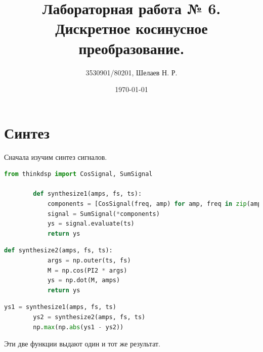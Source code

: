 \documentclass[a4paper, 12pt]{report}
\author{3530901/80201, Шелаев Н. Р.}
\title{Лабораторная работа № 6. Дискретное косинусное преобразование.}
\date{\today}
\begin{document}
	\maketitle
	\tableofcontents
	\listoffigures
	\lstlistoflistings

	\chapter{Синтез}
	Сначала изучим синтез сигналов.
	\begin{lstlisting}[language=Python,caption=Первая функция для синтеза]
		from thinkdsp import CosSignal, SumSignal

		def synthesize1(amps, fs, ts):
			components = [CosSignal(freq, amp) for amp, freq in zip(amps, fs)]
			signal = SumSignal(*components)
			ys = signal.evaluate(ts)
			return ys
	\end{lstlisting}
	\begin{lstlisting}[language=Python,caption=Вторая функция для синтеза]
		def synthesize2(amps, fs, ts):
			args = np.outer(ts, fs)
			M = np.cos(PI2 * args)
			ys = np.dot(M, amps)
			return ys
	\end{lstlisting}
	\begin{lstlisting}[language=Python,caption=Сравнение этих двух функций]
		ys1 = synthesize1(amps, fs, ts)
		ys2 = synthesize2(amps, fs, ts)
		np.max(np.abs(ys1 - ys2))
	\end{lstlisting}
	Эти две функции выдают один и тот же результат.
\end{document}
